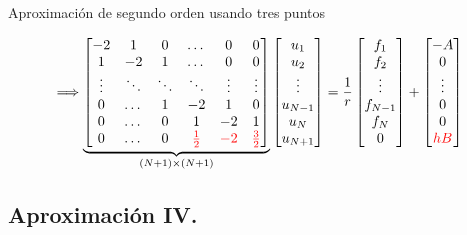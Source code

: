 \documentclass{beamer}
\begin{document}
\begin{frame}{Aproximación de segundo orden usando tres puntos}
\begin{footnotesize}
		\[
		\Longrightarrow
		\underbrace{
			\left[
			\begin{matrix}
			-2 & 1 & 0  & \dots & 0 & 0  \\
			1 & -2 & 1  & \dots & 0 & 0 \\
			\vdots & \ddots & \ddots & \ddots & \vdots & \vdots \\
			0 & \dots & 1 & -2 & 1 & 0 \\
			0 & \dots & 0 & 1 & -2 & 1 \\
			0 & \dots & 0 & \textcolor{red}{\frac{1}{2}} & \textcolor{red}{-2} & \textcolor{red}{\frac{3}{2}}        
			\end{matrix}
			\right] 
		}_{(N+1) \times (N+1)}
		\left[
		\begin{matrix}
		u_1 \\ u_2 \\ \vdots \\ u_{N-1} \\ u_N \\ u_{N+1}
		\end{matrix}
		\right]= 
		\frac{1}{r} \left[
		\begin{matrix}
		f_1 \\ f_2 \\ \vdots \\ f_{N-1} \\ f_N \\ 0
		\end{matrix}
		\right] +
		\left[
		\begin{matrix}
		-A \\ 0 \\  \vdots \\ 0 \\ 0 \\ \textcolor{red}{hB}
		\end{matrix}
		\right]
		\]
		
		
	\end{footnotesize}
	
\end{frame}

\subsection{Aproximación IV.}
\end{document}
